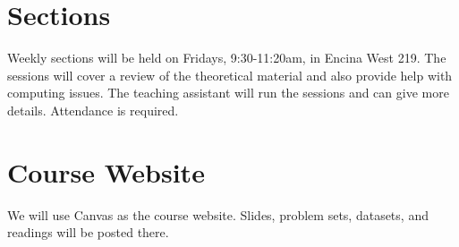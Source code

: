 \documentclass[PS]{syllabus}
\newif\ifrelease
\begin{document}
\begin{syllabus}
\section*{Sections}

\ifrelease Sections will be held once a week\else Weekly sections will be held on Fridays, 9:30-11:20am, in Encina West 219\fi. The sessions will cover a review of the theoretical material and also provide help with computing issues. The teaching assistant will run the sessions and can give more details. Attendance is required.

\section*{Course Website}

\ifrelease
The slides, worksheets, short videos, {\tt R} code, and data are on the course site:
\begin{center}
\url{https://teaching.yiqingxu.org/regression-lectures/}
\end{center}
\else
We will use Canvas as the course website. Slides, problem sets, datasets, and readings will be posted there.
\fi






\end{syllabus}
\end{document}

